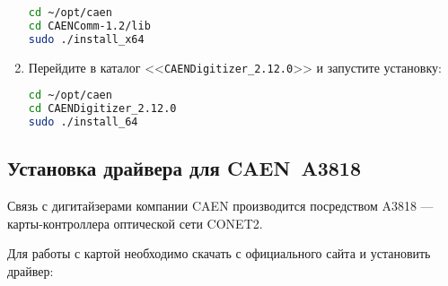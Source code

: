 \documentclass[12pt, a4paper, oneside, onecolumn]{book}
\newcommand{\DIRECTORY}[1]{<<{\tt #1}>>}
\begin{document}
\begin{enumerate}
\begin{lstlisting}[language=bash]
cd ~/opt/caen
cd CAENComm-1.2/lib
sudo ./install_x64
\end{lstlisting}

\item Перейдите в каталог \DIRECTORY{CAENDigitizer\_2.12.0} и запустите установку:

\begin{lstlisting}[language=bash]
cd ~/opt/caen
cd CAENDigitizer_2.12.0
sudo ./install_64
\end{lstlisting}

\end{enumerate}

\subsection{Установка драйвера для CAEN~A3818}

Связь с дигитайзерами компании CAEN производится посредством A3818 --- карты-контроллера оптической сети CONET2.

Для работы с картой необходимо скачать с официального сайта \cite{CaenHome} и установить драйвер:
\end{document}
